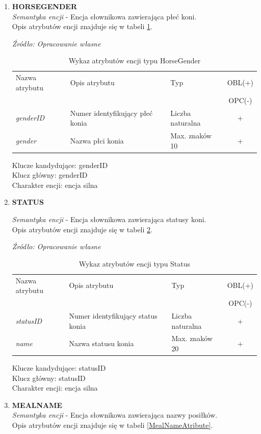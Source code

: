 \documentclass[12pt,oneside]{report}
\begin{document}
\begin{enumerate}[start=10,label={\bfseries ENC$\backslash$\arabic*}]
	\item \textbf{HORSEGENDER} \\
	\textit{Semantyka encji} - Encja słownikowa zawierająca płeć koni.
	\\
	Opis atrybutów encji znajduje się w tabeli \ref{HorseGenderAtribute}.
	
	\begin{table}[H]
		\caption{Wykaz atrybutów encji typu HorseGender }
		\textit{Źródło: Opracowanie własne}
		\label{HorseGenderAtribute}
		\centering
		\begin{tabular}{|l|l|l|c|}
			\hline
			Nazwa atrybutu & Opis atrybutu & Typ & OBL(+) \\
			& & &  OPC(-) \\
			\hline
			\textit{genderID} & Numer identyfikujący płeć konia & Liczba naturalna & + \\
			\hline
			\textit{gender} &  Nazwa płci konia & Max. znaków 10 & + \\
			\hline
		\end{tabular}
	\end{table}
	Klucze kandydujące: genderID \\
	Klucz główny: genderID \\
	Charakter encji: encja silna
	\item \textbf{STATUS}
	
	\textit{Semantyka encji} - Encja słownikowa zawierająca statusy koni.
		\\ 
	Opis atrybutów encji znajduje się w tabeli \ref{StatusAtribute}.
	
	\begin{table}[H]
		\caption{Wykaz atrybutów encji typu Status}
		\textit{Źródło: Opracowanie własne}
		\label{StatusAtribute}
		\centering
		\begin{tabular}{|l|l|l|c|}
			\hline
			Nazwa atrybutu & Opis atrybutu & Typ & OBL(+) \\
			& & &  OPC(-) \\
			\hline
			\textit{statusID} & Numer identyfikujący status konia & Liczba naturalna & + \\
			\hline
			\textit{name} &  Nazwa statusu konia & Max. znaków 20 & + \\
			\hline
		\end{tabular}
	\end{table}
	Klucze kandydujące: statusID \\
	Klucz główny: statusID \\
	Charakter encji: encja silna
	\item \textbf{MEALNAME} \\
	\textit{Semantyka encji} - Encja słownikowa zawierająca nazwy posiłków.
		\\ 
Opis atrybutów encji znajduje się w tabeli \ref{MealNameAtribute}.
	

\end{enumerate}
\end{document}
